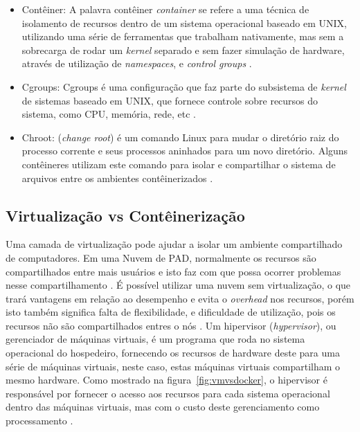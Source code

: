 \documentclass[twoside,english,brazilian]{UNISINOSartigo}
\begin{document}
\begin{itemize}
	\item Contêiner: A palavra contêiner \textit{container} se refere a uma técnica de isolamento de recursos dentro de um sistema operacional baseado em UNIX, utilizando uma série de ferramentas que trabalham nativamente, mas sem a sobrecarga de rodar um \textit{kernel} separado e sem fazer simulação de hardware, através de utilização de \textit{namespaces}, e \textit{control groups} \cite{LXC2016}.
	\item Cgroups: Cgroups é uma configuração que faz parte do subsistema de \textit{kernel} de sistemas baseado em UNIX, que fornece controle sobre recursos do sistema, como CPU, memória, rede, etc  \cite{NICKOLOFF2016}.
	\item Chroot: (\textit{change root}) é um comando Linux para mudar o diretório raiz do processo corrente e seus processos aninhados para um novo diretório. Alguns contêineres utilizam este comando para isolar e compartilhar o sistema de arquivos entre os ambientes contêinerizados \cite{Dua2014}. 
\end{itemize}

\subsection{Virtualização vs Contêinerização}
\label{virtualization}
Uma camada de virtualização pode ajudar a isolar um ambiente compartilhado de computadores. Em uma Nuvem de PAD, normalmente os recursos são compartilhados entre mais usuários e isto faz com que possa ocorrer problemas nesse compartilhamento \cite{Xavier2013}. É possível utilizar uma nuvem sem virtualização, o que trará vantagens em relação ao desempenho e evita o \textit{overhead} nos recursos, porém isto também significa falta de flexibilidade, e dificuldade de utilização, pois os recursos não são compartilhados entres o nós \cite{Kominos2017}. Um hipervisor (\textit{hypervisor}), ou gerenciador de máquinas virtuais, é um programa que roda no sistema operacional do hospedeiro, fornecendo os recursos de hardware deste para uma série de máquinas virtuais, neste caso, estas máquinas virtuais compartilham o mesmo hardware. Como mostrado na figura~\ref{fig:vmvsdocker}, o hipervisor é responsável por fornecer o acesso aos recursos para cada sistema operacional dentro das máquinas virtuais, mas com o custo deste gerenciamento como processamento \cite{Zhang2016}. 
\end{document}
